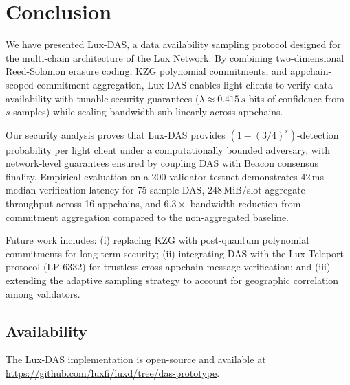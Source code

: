 \section{Conclusion}

\label{sec:conclusion}

We have presented Lux-DAS, a data availability sampling protocol designed for the multi-chain
architecture of the Lux Network. By combining two-dimensional Reed-Solomon erasure coding,
KZG polynomial commitments, and appchain-scoped commitment aggregation, Lux-DAS enables light
clients to verify data availability with tunable security guarantees ($\lambda \approx 0.415\,s$ bits
of confidence from $s$ samples) while scaling bandwidth sub-linearly across appchains.

Our security analysis proves that Lux-DAS provides $(1 - (3/4)^s)$-detection probability per
light client under a computationally bounded adversary, with network-level guarantees ensured
by coupling DAS with Beacon consensus finality. Empirical evaluation on a 200-validator
testnet demonstrates 42\,ms median verification latency for 75-sample DAS, 248\,MiB/slot
aggregate throughput across 16 appchains, and $6.3\times$ bandwidth reduction from commitment
aggregation compared to the non-aggregated baseline.

Future work includes: (i) replacing KZG with post-quantum polynomial commitments for long-term
security; (ii) integrating DAS with the Lux Teleport protocol (LP-6332) for trustless cross-appchain
message verification; and (iii) extending the adaptive sampling strategy to account for
geographic correlation among validators.

\subsection{Availability}

The Lux-DAS implementation is open-source and available at
\url{https://github.com/luxfi/luxd/tree/das-prototype}.

